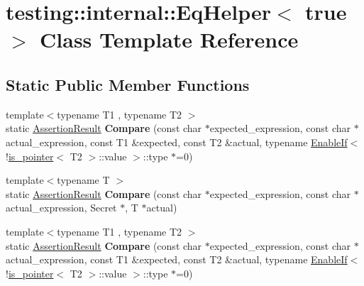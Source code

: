 \hypertarget{classtesting_1_1internal_1_1_eq_helper_3_01true_01_4}{}\section{testing\+:\+:internal\+:\+:Eq\+Helper$<$ true $>$ Class Template Reference}
\label{classtesting_1_1internal_1_1_eq_helper_3_01true_01_4}
\subsection*{Static Public Member Functions}
\begin{DoxyCompactItemize}
\item 
\hypertarget{classtesting_1_1internal_1_1_eq_helper_3_01true_01_4_a70d6d7e3cb1df06ad6114f25e843fd6d}{}{\footnotesize template$<$typename T1 , typename T2 $>$ }\\static \hyperlink{classtesting_1_1_assertion_result}{Assertion\+Result} {\bfseries Compare} (const char $\ast$expected\+\_\+expression, const char $\ast$actual\+\_\+expression, const T1 \&expected, const T2 \&actual, typename \hyperlink{structtesting_1_1internal_1_1_enable_if}{Enable\+If}$<$!\hyperlink{structtesting_1_1internal_1_1is__pointer}{is\+\_\+pointer}$<$ T2 $>$\+::value $>$\+::type $\ast$=0)\label{classtesting_1_1internal_1_1_eq_helper_3_01true_01_4_a70d6d7e3cb1df06ad6114f25e843fd6d}

\item 
\hypertarget{classtesting_1_1internal_1_1_eq_helper_3_01true_01_4_ab38e840297adb48f18767a1a99187fb3}{}{\footnotesize template$<$typename T $>$ }\\static \hyperlink{classtesting_1_1_assertion_result}{Assertion\+Result} {\bfseries Compare} (const char $\ast$expected\+\_\+expression, const char $\ast$actual\+\_\+expression, Secret $\ast$, T $\ast$actual)\label{classtesting_1_1internal_1_1_eq_helper_3_01true_01_4_ab38e840297adb48f18767a1a99187fb3}

\item 
\hypertarget{classtesting_1_1internal_1_1_eq_helper_3_01true_01_4_a70d6d7e3cb1df06ad6114f25e843fd6d}{}{\footnotesize template$<$typename T1 , typename T2 $>$ }\\static \hyperlink{classtesting_1_1_assertion_result}{Assertion\+Result} {\bfseries Compare} (const char $\ast$expected\+\_\+expression, const char $\ast$actual\+\_\+expression, const T1 \&expected, const T2 \&actual, typename \hyperlink{structtesting_1_1internal_1_1_enable_if}{Enable\+If}$<$!\hyperlink{structtesting_1_1internal_1_1is__pointer}{is\+\_\+pointer}$<$ T2 $>$\+::value $>$\+::type $\ast$=0)\label{classtesting_1_1internal_1_1_eq_helper_3_01true_01_4_a70d6d7e3cb1df06ad6114f25e843fd6d}


\end{DoxyCompactItemize}
